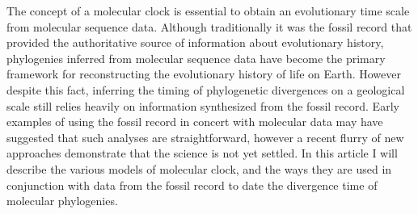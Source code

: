 The concept of a molecular clock is essential to obtain an evolutionary time scale from molecular sequence data.
Although traditionally it was the fossil record that provided the authoritative source of information about evolutionary history, phylogenies inferred from molecular sequence data have become the primary framework for reconstructing the evolutionary history of life on Earth. However despite this fact, inferring the timing of phylogenetic divergences on a geological scale still relies heavily on information synthesized from the fossil record. Early examples of using the fossil record in concert with molecular data may have suggested that such analyses are straightforward, however a recent flurry of new approaches demonstrate that the science is not yet settled. In this article I will describe the various models of molecular clock, and the ways they are used in conjunction with data from the fossil record to date the divergence time of molecular phylogenies.
  